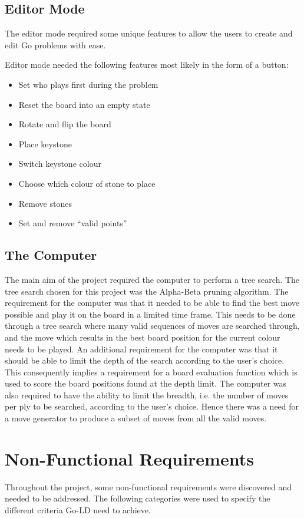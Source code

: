 \documentclass{l4proj}
\begin{document}
\subsection{Editor Mode}
The editor mode required some unique features to allow the users to create and edit  Go problems with ease.

Editor mode needed the following features most likely in the form of a button:
\begin{itemize}
\item Set who plays first during the problem
\item Reset the board into an empty state
\item Rotate and flip the board
\item Place keystone
\item Switch keystone colour
\item Choose which colour of stone to place
\item Remove stones
\item Set and remove “valid points”
\end{itemize}

\subsection{The Computer}
The main aim of the project required the computer to perform a tree search. The tree search chosen for this project was the Alpha-Beta pruning algorithm. The requirement for the computer was that it needed to be able to find the best move possible and play it on the board in a limited time frame. This needs to be done through a tree search where many valid sequences of moves are searched through, and the move which results in the best board position for the current colour needs to be played. An additional requirement for the computer was that it should be able to limit the depth of the search according to the user’s choice. This consequently implies a requirement for a board evaluation function which is used to score the board positions found at the depth limit. The computer was also required to have the ability to limit the breadth, i.e. the number of moves per ply to be searched, according to the user’s choice. Hence there was a need for a move generator to produce a subset of moves from all the valid moves.


\section{Non-Functional Requirements}
Throughout the project, some non-functional requirements were discovered and needed to be addressed. The following categories were used to specify the different criteria Go-LD need to achieve.
\end{document}
